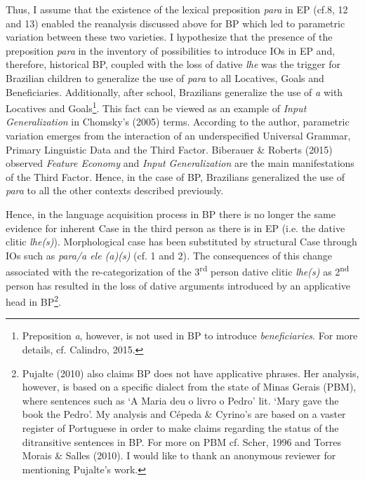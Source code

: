 \documentclass[12pt]{article}
\newenvironment{styleStandard}{\setlength\leftskip{0cm}\setlength\rightskip{0cm plus 1fil}\setlength\parindent{0cm}\setlength\parfillskip{0pt plus 1fil}\setlength\parskip{0cm plus 1pt}\writerlistparindent\writerlistleftskip\leavevmode\normalfont\normalsize\writerlistlabel\ignorespaces}{\unskip\vspace{0cm plus 1pt}\par}
\newcommand\writerlistleftskip{}
\newcommand\writerlistparindent{}
\newcommand\writerlistlabel{}
\begin{document}
\begin{styleStandard}
Thus, I assume that the existence of the lexical preposition \textit{para} in EP (cf.8, 12 and 13) enabled the reanalysis discussed above for BP which led to parametric variation between these two varieties. I hypothesize that the presence of the preposition \textit{para} in the inventory of possibilities to introduce IOs in EP and, therefore, historical BP, coupled with the loss of dative \textit{lhe} was the trigger for Brazilian children to generalize the use of \textit{para} to all Locatives, Goals and Beneficiaries. Additionally, after school, Brazilians generalize the use of \textit{a} with Locatives and Goals\footnote{ \textrm{Preposition }\textrm{\textit{a}}\textrm{, however, is not used in BP to introduce }\textrm{\textit{beneficiaries}}\textrm{. For more details, cf. Calindro, 2015.}}. This fact can be viewed as an example of \textit{Input Generalization} in Chomsky’s (2005) terms. According to the author, parametric variation emerges from the interaction of an underspecified Universal Grammar, Primary Linguistic Data and the Third Factor. Biberauer \& Roberts (2015) observed \textit{Feature Economy} and \textit{Input Generalization} are the main manifestations of the Third Factor. Hence, in the case of BP, Brazilians generalized the use of \textit{para} to all the other contexts described previously.
\end{styleStandard}

\begin{styleStandard}
Hence, in the language acquisition process in BP there is no longer the same evidence for inherent Case in the third person as there is in EP (i.e. the dative clitic \textit{lhe(s)}). Morphological case has been substituted by structural Case through IOs such as \textit{para/a ele (a)(s) }(cf. 1 and 2)\textit{. }The consequences of this change associated with the re-categorization of the 3\textsuperscript{rd} person dative clitic \textit{lhe(s)} as 2\textsuperscript{nd} person has resulted in the loss of dative arguments introduced by an applicative head in BP\footnote{ \textrm{Pujalte (2010) also claims BP does not have applicative phrases. Her analysis, however, is based on a specific dialect from the state of Minas Gerais (PBM), where sentences such as ‘A Maria deu o livro o Pedro’ lit. ‘Mary gave the book the Pedro’. My analysis and Cépeda \& Cyrino’s are based on a vaster register of Portuguese in order to make claims regarding the status of the ditransitive sentences in BP. For more on PBM cf. Scher, 1996 and Torres Morais \& Salles (2010). I would like to thank an anonymous reviewer for mentioning Pujalte’s work.}}. 
\end{styleStandard}
\end{document}
